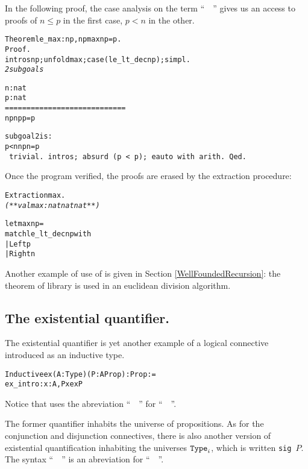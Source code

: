 \documentclass[11pt]{article}
\begin{document}
In the following proof, the case analysis on the term
``~~'' gives us an access to proofs
of $n\leq p$ in the first case, $p<n$ in the other.

\begin{alltt}
Theorem le_max : {\prodsym} n p, n {\coqle} p {\arrow} max n p = p.
Proof.
 intros n p ; unfold max ; case (le_lt_dec n p); simpl.
\it
2 subgoals

  n : nat
  p : nat
  ============================
   n {\coqle} p {\arrow} n {\coqle} p {\arrow} p = p

subgoal 2 is:
 p < n {\arrow} n {\coqle} p {\arrow} n = p
\tt
 trivial.
 intros; absurd (p < p); eauto with arith.
Qed.
\end{alltt}


 Once the program verified, the proofs are
erased by the extraction procedure:

\begin{alltt}
Extraction max.
\it
(** val max : nat {\arrow} nat {\arrow} nat **)

let max n p =
  match le_lt_dec n p with
    | Left {\arrow} p
    | Right {\arrow} n
\end{alltt}

Another example of use of  is given  in Section
\ref{WellFoundedRecursion}: the theorem  of
library  is used in an euclidean division
algorithm.

\subsection{The existential quantifier.}\label{ex-def}
The existential quantifier is yet another example of a logical
connective introduced as an inductive type.

\begin{alltt}
Inductive ex (A : Type) (P : A \arrow{} Prop) : Prop :=
    ex_intro : {\prodsym} x : A, P x \arrow{} ex P
\end{alltt}

Notice that {\coq} uses the abreviation ``~~''
for \linebreak ``~~''.


\noindent The former quantifier inhabits the universe of propositions.
As for the conjunction and disjunction connectives, there is also another
version of existential quantification inhabiting the universes $\texttt{Type}_i$,
which is written \texttt{sig $P$}. The syntax
``~~'' is an abreviation for ``~~''.
\end{document}

